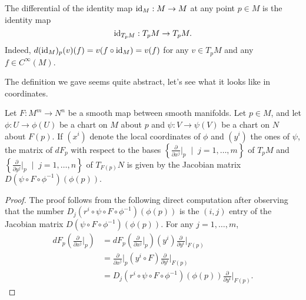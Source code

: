 \begin{remark}
  The differential of the identity map $\operatorname{id}_M:M\to M$ at any point $p\in M$ is the identity map
  \begin{equation}
    \operatorname{id}_{T_pM}: T_pM \to T_pM.
  \end{equation}
  Indeed, $d (\operatorname{id}_M)_p(v)(f) = v(f\circ\operatorname{id}_M) = v(f)$ for any $v\in T_pM$ and any $f\in C^\infty(M)$.
\end{remark}

The definition we gave seems quite abstract, let's see what it looks like in coordinates.

\begin{proposition}\label{prop:DiffCoords}
  Let $F:M^m\to N^n$ be a smooth map between smooth manifolds.
  Let $p\in M$, and let $\phi : U \to \phi(U)$ be a chart on $M$ about $p$ and $\psi: V \to \psi(V)$ be a chart on $N$ about $F(p)$.
  If $(x^i)$ denote the local coordinates of $\phi$ and $(y^i)$ the ones of $\psi$, the matrix of $dF_p$ with respect to the bases $\left\{\frac{\partial}{\partial x^j}\big|_p \;\mid\; j=1,\ldots,m\right\}$ of $T_pM$ and $\left\{\frac{\partial}{\partial y^j}\big|_p \;\mid\; j=1,\ldots,n\right\}$ of $T_{F(p)}N$ is given by the Jacobian matrix $D(\psi\circ F \circ\phi^{-1})(\phi(p))$.
\end{proposition}
\begin{proof}
  The proof follows from the following direct computation after observing that the number $D_j(r^i \circ \psi \circ F \circ \phi^{-1})(\phi(p))$ is the $(i,j)$ entry of the Jacobian matrix $D(\psi\circ F \circ\phi^{-1})(\phi(p))$. For any $j=1,\ldots,m$,
  \begin{align}
    dF_p \left(\frac{\partial}{\partial x^j}\Big|_p\right)
    &= %
      dF_p \left(\frac{\partial}{\partial x^j}\Big|_p\right) (y^i) \frac{\partial}{\partial y^i}\Big|_{F(p)} \\
    &= %
      \frac{\partial}{\partial x^j}\Big|_p (y^i \circ F) \frac{\partial}{\partial y^i}\Big|_{F(p)} \\
    &=%
      D_j(r^i \circ \psi \circ F \circ \phi^{-1})(\phi(p)) \frac{\partial}{\partial y^i}\Big|_{F(p)}.
  \end{align}
\end{proof}


